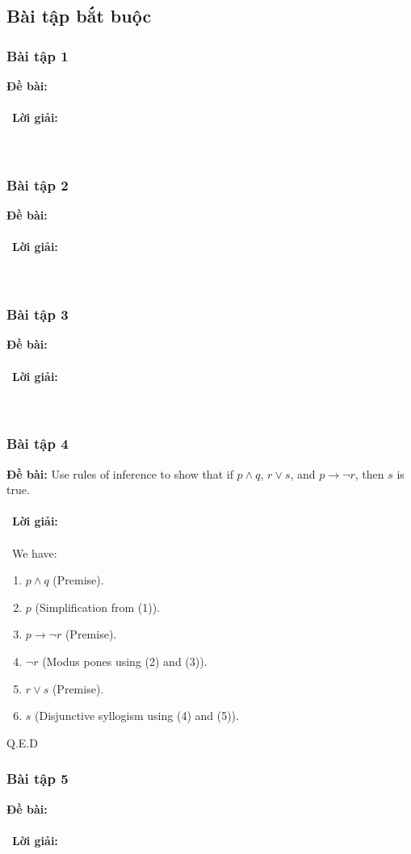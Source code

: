 \documentclass[a4paper]{article}
\begin{document}
\subsection{Bài tập bắt buộc}
\subsubsection{Bài tập 1}
\textbf{Đề bài:} 
\\\ \\\
\textbf{Lời giải:} \\\ \\\
\clearpage
\subsubsection{Bài tập 2}
\textbf{Đề bài:} 
\\\ \\\
\textbf{Lời giải:} \\\ \\\
\clearpage
\subsubsection{Bài tập 3}
\textbf{Đề bài:} 
\\\ \\\
\textbf{Lời giải:} \\\ \\\
\clearpage
\subsubsection{Bài tập 4}
\textbf{Đề bài:} Use rules of inference to show that if $p \land q$, $r \lor s$, and $p \rightarrow \lnot r$, then $s$ is true. \\\ \\\
\textbf{Lời giải:} \\\ \\\
We have:
\begin{enumerate}
\item $p \land q$ (Premise).
\item $p$ (Simplification from (1)).
\item $p \rightarrow \lnot r$ (Premise).
\item $\lnot r$ (Modus pones using (2) and (3)).
\item $r \lor s$ (Premise).
\item $s$ (Disjunctive syllogism using (4) and (5)).
\end{enumerate}
Q.E.D

\clearpage
\subsubsection{Bài tập 5}
\textbf{Đề bài:} 
\\\ \\\
\textbf{Lời giải:} \\\ \\\
\clearpage
\end{document}
